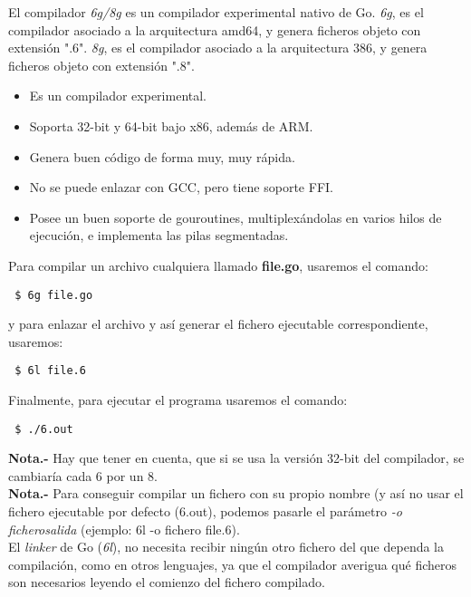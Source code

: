 	El compilador \emph{6g/8g} es un compilador experimental nativo de Go.
	\emph{6g}, es el compilador asociado a la arquitectura amd64, y genera
	ficheros objeto con extensión ".6". \emph{8g}, es el compilador asociado
	a la arquitectura 386, y genera ficheros objeto con extensión ".8".
	\clearpage \begin{itemize} \item Es un compilador experimental.  \item
	Soporta 32-bit y 64-bit bajo x86, además de ARM.  \item Genera buen código
	de forma muy, muy rápida.  \item No se puede enlazar con GCC, pero tiene
	soporte FFI.  \item Posee un buen soporte de gouroutines, multiplexándolas
	en varios hilos de ejecución, e implementa las pilas segmentadas.
	\end{itemize}
	
	Para compilar un archivo cualquiera llamado \textbf{file.go}, usaremos el
	comando:
	
	\begin{verbatim} $ 6g file.go \end{verbatim}
	
	y para enlazar el archivo y así generar el fichero ejecutable
	correspondiente, usaremos:
	
	\begin{verbatim} $ 6l file.6 \end{verbatim}
	
	Finalmente, para ejecutar el programa usaremos el comando:
	
	\begin{verbatim} $ ./6.out \end{verbatim}
	
	\textbf{Nota.-} Hay que tener en cuenta, que si se usa la versión 32-bit del
	compilador, se cambiaría cada 6 por un 8.\\
	
	\textbf{Nota.-} Para conseguir compilar un fichero con su propio nombre (y
	así no usar el fichero ejecutable por defecto (6.out), podemos pasarle el
	parámetro \emph{-o fichero\textunderscore salida} (ejemplo: 6l -o fichero
	file.6).\\
	
	El \emph{linker} de Go (\textit{6l}), no necesita recibir ningún otro
	fichero del que dependa la compilación, como en otros lenguajes, ya que el
	compilador averigua qué ficheros son necesarios leyendo el comienzo del
	fichero compilado.\\
	

